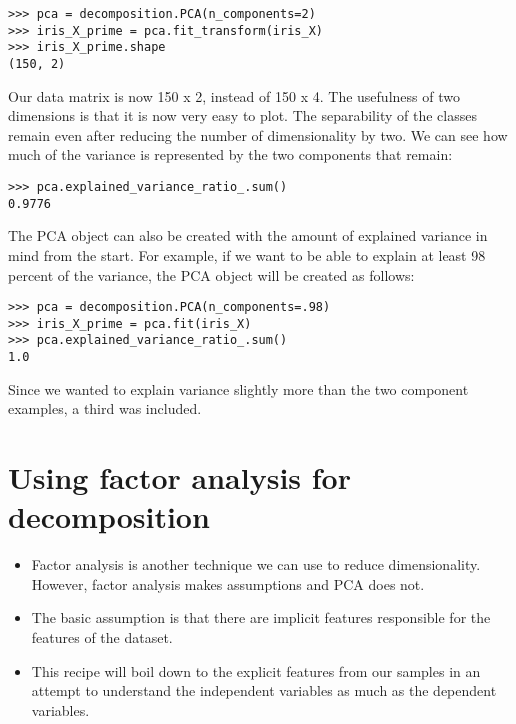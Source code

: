 \documentclass[SKL-MASTER.tex]{subfiles}
\begin{document}
\begin{framed}
\begin{verbatim}
>>> pca = decomposition.PCA(n_components=2)
>>> iris_X_prime = pca.fit_transform(iris_X)
>>> iris_X_prime.shape
(150, 2)
\end{verbatim}
\end{framed}
Our data matrix is now 150 x 2, instead of 150 x 4.
The usefulness of two dimensions is that it is now very easy to plot.
The separability of the classes remain even after reducing the number of dimensionality by two.
We can see how much of the variance is represented by the two components that remain:
\begin{framed}
\begin{verbatim}
>>> pca.explained_variance_ratio_.sum()
0.9776
\end{verbatim}
\end{framed}
The PCA object can also be created with the amount of explained variance in mind from
the start. For example, if we want to be able to explain at least 98 percent of the variance,
the PCA object will be created as follows:
\begin{framed}
\begin{verbatim}
>>> pca = decomposition.PCA(n_components=.98)
>>> iris_X_prime = pca.fit(iris_X)
>>> pca.explained_variance_ratio_.sum()
1.0
\end{verbatim}
\end{framed}
Since we wanted to explain variance slightly more than the two component examples, a third
was included.
\newpage
\section{Using factor analysis for decomposition}
\begin{itemize}
\item Factor analysis is another technique we can use to reduce dimensionality. However, factor
analysis makes assumptions and PCA does not. 
\item The basic assumption is that there are
implicit features responsible for the features of the dataset.
\item This recipe will boil down to the explicit features from our samples in an attempt to
understand the independent variables as much as the dependent variables.
\end{itemize}
\end{document}
